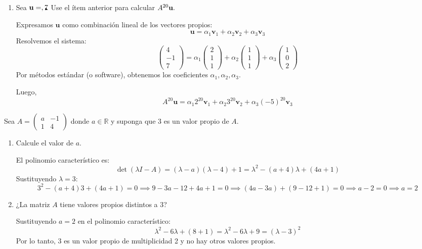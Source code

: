 \begin{prob}
\begin{enumerate}[$a)$]
\item Sea ${\bf{u}}=\vector(4,-1,7).$ Use el ítem anterior para calcular $A^{20}{\bf{u}}.$
\begin{myproof}
Expresamos $\mathbf{u}$ como combinación lineal de los vectores propios:
\[
\mathbf{u} = \alpha_1 \mathbf{v}_1 + \alpha_2 \mathbf{v}_2 + \alpha_3 \mathbf{v}_3
\]
Resolvemos el sistema:
\[
\begin{pmatrix} 4 \\ -1 \\ 7 \end{pmatrix} = \alpha_1 \begin{pmatrix} 2 \\ 1 \\ 1 \end{pmatrix} + \alpha_2 \begin{pmatrix} 1 \\ 1 \\ 1 \end{pmatrix} + \alpha_3 \begin{pmatrix} 1 \\ 0 \\ 2 \end{pmatrix}
\]
Por métodos estándar (o software), obtenemos los coeficientes $\alpha_1, \alpha_2, \alpha_3$.

Luego,
\[
A^{20}\mathbf{u} = \alpha_1 2^{20} \mathbf{v}_1 + \alpha_2 3^{20} \mathbf{v}_2 + \alpha_3 (-5)^{20} \mathbf{v}_3
\]
\end{myproof}
\end{enumerate}
\end{prob}

 
\begin{prob}
Sea $A=\left( \begin{array}{cc} a&-1 \\ 1&4 \end{array} \right)$ donde $a\in \mathbb{R}$ y suponga que $3$ es un valor propio de $A.$ 
\begin{enumerate}[$a)$]
\item Calcule el valor de $a.$
\begin{myproof}
El polinomio característico es:
\[
\det(\lambda I - A) = (\lambda-a)(\lambda-4) + 1 = \lambda^2 - (a+4)\lambda + (4a+1)
\]
Sustituyendo $\lambda=3$:
\[
3^2 - (a+4)3 + (4a+1) = 0 \implies 9 - 3a - 12 + 4a + 1 = 0 \implies (4a-3a) + (9-12+1) = 0 \implies a - 2 = 0 \implies a=2
\]
\end{myproof}

\item ¿La matriz $A$ tiene valores propios distintos a $3$?
\begin{myproof}
Sustituyendo $a=2$ en el polinomio característico:
\[
\lambda^2 - 6\lambda + (8+1) = \lambda^2 - 6\lambda + 9 = (\lambda-3)^2
\]
Por lo tanto, $3$ es un valor propio de multiplicidad 2 y no hay otros valores propios.
\end{myproof}
\end{enumerate}
\end{prob}

